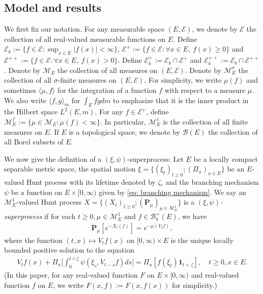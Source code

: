 \documentclass[12pt,a4paper]{amsart}
\theoremstyle{definition}
\numberwithin{equation}{section}
\begin{document}
\subsection{Model and results}

We first fix our notation.
For any measurable space $(E,\mathscr E)$, we denote by $\mathscr E$ the collection of all real-valued measurable functions on $E$.
Define $\mathscr E_b :=\{f \in \mathscr E: \sup_{x\in E}|f(x)|<\infty \}$, $\mathscr E^+ :=\{f\in \mathscr E: \forall x\in E,~f(x)\geq 0\}$ and $\mathscr E^{++} :=\{f\in \mathscr E: \forall x\in E,~f(x)> 0\}$.
Define $\mathscr E^+_b := \mathscr E_b \cap \mathscr E^+$ and $\mathscr E^{++}_b:= \mathscr E_b \cap \mathscr E^{++}$.
Denote by $\mathcal M_E$ the collection of all measures on $(E,\mathscr E)$.
Denote by $\mathcal M^\sigma_E$ the collection of all  $\sigma$-finite measures on $(E,\mathscr E)$.
For simplicity, we write $\mu(f)$ and sometimes $\langle \mu, f\rangle$ for the integration of a function $f$ with respect to a measure $\mu$.
We also write $\langle f, g\rangle_m$ for $\int_E fg dm$ to emphasize that it is the inner product in the Hilbert space $L^2(E, m)$.
For any $f \in \mathscr E^+$, define $\mathcal M^f_E:= \{\mu \in \mathcal M_E: \mu(f) < \infty\}$.
In particular, $\mathcal M^1_E$ is the collection of all  finite measures on $E$.
If $E$ is a topological space, we denote by $\mathscr B(E)$ the collection of all  Borel subsets of $E$.
	
We now give the definition of a $(\xi, \psi)$-superprocess:
Let $E$ be a locally compact separable metric space, the spatial motion $\xi=\{(\xi_t)_{t\geq 0};(\Pi_x)_{x\in E}\}$ be an $E$-valued Hunt process with its lifetime denoted by $\zeta$, and the branching mechanism $\psi$ be a function on $E\times[0,\infty)$ given by \eqref{eq: branching mechanism}.
We say an $\mathcal M^1_E$-valued Hunt process $X=\{(X_t)_{t\geq 0}; (\mathbf P_\mu)_{\mu \in \mathcal M^1_E}\}$ is a \emph{$(\xi,\psi)$-superprocess} if for each $t\geq 0, \mu \in \mathcal M_E^1$ and  $f\in \mathscr B^+_b(E)$, we have
\begin{align}
	\mathbf P_\mu [e^{-X_t(f)}] = e^{-\mu(V_tf)},
\end{align}
where the function $(t,x) \mapsto V_tf(x)$ on $[0,\infty) \times E$ is the unique locally bounded positive solution to the equation
\begin{align}\label{eq:FKPP_in_definition}
	V_t f(x) + \Pi_x \Big[  \int_0^{t\wedge \zeta} \psi (\xi_s,V_{t-s} f) ds \Big]
	= \Pi_x [ f(\xi_t)\mathbf 1_{t<\zeta} ],
	\quad t \geq 0, x \in E.
\end{align}
(In this paper, for any real-valued function $F$ on $E\times [0,\infty)$ and real-valued function $f$ on $E$, we write $F(x,f):= F(x,f(x))$ for simplicity.)
\end{document}
